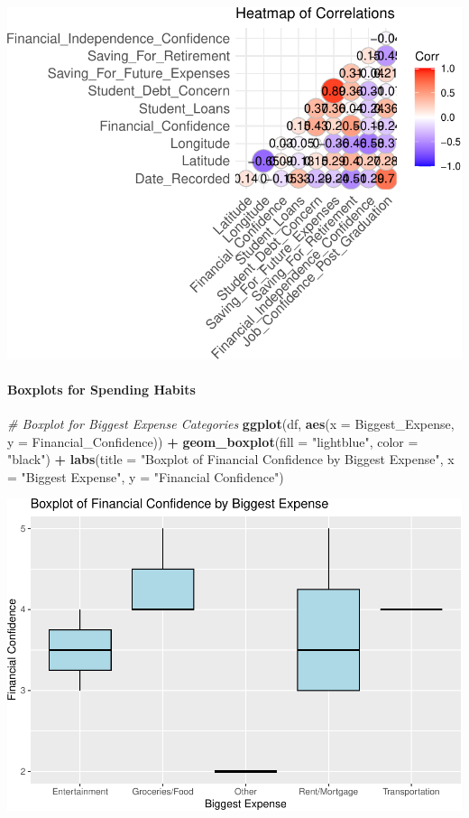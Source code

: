 \documentclass[
]{article}
\newenvironment{Shaded}{\begin{snugshade}}{\end{snugshade}}
\newcommand{\AttributeTok}[1]{\textcolor[rgb]{0.13,0.29,0.53}{#1}}
\newcommand{\CommentTok}[1]{\textcolor[rgb]{0.56,0.35,0.01}{\textit{#1}}}
\newcommand{\FunctionTok}[1]{\textcolor[rgb]{0.13,0.29,0.53}{\textbf{#1}}}
\newcommand{\NormalTok}[1]{#1}
\newcommand{\SpecialCharTok}[1]{\textcolor[rgb]{0.81,0.36,0.00}{\textbf{#1}}}
\newcommand{\StringTok}[1]{\textcolor[rgb]{0.31,0.60,0.02}{#1}}
\begin{document}
\includegraphics{Project1_files/figure-latex/unnamed-chunk-19-1.pdf}

\paragraph{Boxplots for Spending
Habits}\label{boxplots-for-spending-habits}

\begin{Shaded}
\begin{Highlighting}[]
\CommentTok{\# Boxplot for Biggest Expense Categories}
\FunctionTok{ggplot}\NormalTok{(df, }\FunctionTok{aes}\NormalTok{(}\AttributeTok{x =}\NormalTok{ Biggest\_Expense, }\AttributeTok{y =}\NormalTok{ Financial\_Confidence)) }\SpecialCharTok{+}
  \FunctionTok{geom\_boxplot}\NormalTok{(}\AttributeTok{fill =} \StringTok{"lightblue"}\NormalTok{, }\AttributeTok{color =} \StringTok{"black"}\NormalTok{) }\SpecialCharTok{+}
  \FunctionTok{labs}\NormalTok{(}\AttributeTok{title =} \StringTok{"Boxplot of Financial Confidence by Biggest Expense"}\NormalTok{, }\AttributeTok{x =} \StringTok{"Biggest Expense"}\NormalTok{, }\AttributeTok{y =} \StringTok{"Financial Confidence"}\NormalTok{)}
\end{Highlighting}
\end{Shaded}

\includegraphics{Project1_files/figure-latex/unnamed-chunk-20-1.pdf}
\end{document}

